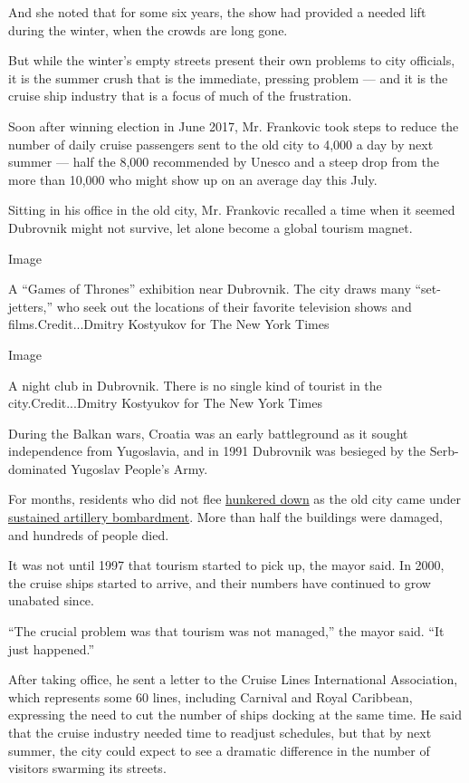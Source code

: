 And she noted that for some six years, the show had provided a needed
lift during the winter, when the crowds are long gone.

But while the winter's empty streets present their own problems to city
officials, it is the summer crush that is the immediate, pressing
problem --- and it is the cruise ship industry that is a focus of much
of the frustration.

Soon after winning election in June 2017, Mr. Frankovic took steps to
reduce the number of daily cruise passengers sent to the old city to
4,000 a day by next summer --- half the 8,000 recommended by Unesco and
a steep drop from the more than 10,000 who might show up on an average
day this July.

Sitting in his office in the old city, Mr. Frankovic recalled a time
when it seemed Dubrovnik might not survive, let alone become a global
tourism magnet.

Image

A ``Games of Thrones'' exhibition near Dubrovnik. The city draws many
``set-jetters,'' who seek out the locations of their favorite television
shows and films.Credit...Dmitry Kostyukov for The New York Times

Image

A night club in Dubrovnik. There is no single kind of tourist in the
city.Credit...Dmitry Kostyukov for The New York Times

During the Balkan wars, Croatia was an early battleground as it sought
independence from Yugoslavia, and in 1991 Dubrovnik was besieged by the
Serb-dominated Yugoslav People's Army.

For months, residents who did not flee
\href{https://www.nytimes3xbfgragh.onion/1991/11/16/world/dubrovnik-diary-shelling-sniper-fire-chaos-and-for-a-few-escape-by-sea.html}{hunkered
down} as the old city came under
\href{https://www.nytimes3xbfgragh.onion/1992/07/15/world/the-walls-and-the-will-of-dubrovnik.html}{sustained
artillery bombardment}. More than half the buildings were damaged, and
hundreds of people died.

It was not until 1997 that tourism started to pick up, the mayor said.
In 2000, the cruise ships started to arrive, and their numbers have
continued to grow unabated since.

``The crucial problem was that tourism was not managed,'' the mayor
said. ``It just happened.''

After taking office, he sent a letter to the Cruise Lines International
Association, which represents some 60 lines, including Carnival and
Royal Caribbean, expressing the need to cut the number of ships docking
at the same time. He said that the cruise industry needed time to
readjust schedules, but that by next summer, the city could expect to
see a dramatic difference in the number of visitors swarming its
streets.

